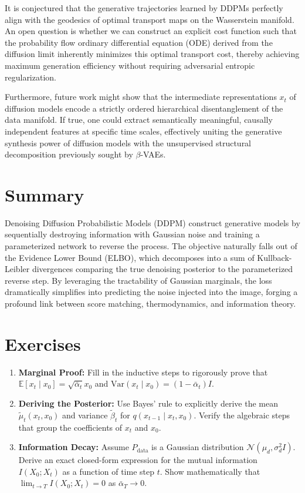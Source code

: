 \begin{horizon}
It is conjectured that the generative trajectories learned by DDPMs perfectly align with the geodesics of optimal transport maps on the Wasserstein manifold. An open question is whether we can construct an explicit cost function such that the probability flow ordinary differential equation (ODE) derived from the diffusion limit inherently minimizes this optimal transport cost, thereby achieving maximum generation efficiency without requiring adversarial entropic regularization.

Furthermore, future work might show that the intermediate representations $x_t$ of diffusion models encode a strictly ordered hierarchical disentanglement of the data manifold. If true, one could extract semantically meaningful, causally independent features at specific time scales, effectively uniting the generative synthesis power of diffusion models with the unsupervised structural decomposition previously sought by $\beta$-VAEs.
\end{horizon}

\section*{Summary}
Denoising Diffusion Probabilistic Models (DDPM) construct generative models by sequentially destroying information with Gaussian noise and training a parameterized network to reverse the process. The objective naturally falls out of the Evidence Lower Bound (ELBO), which decomposes into a sum of Kullback-Leibler divergences comparing the true denoising posterior to the parameterized reverse step. By leveraging the tractability of Gaussian marginals, the loss dramatically simplifies into predicting the noise injected into the image, forging a profound link between score matching, thermodynamics, and information theory.

\section*{Exercises}
\begin{enumerate}
    \item \textbf{Marginal Proof:} Fill in the inductive steps to rigorously prove that $\mathbb{E}[x_t \mid x_0] = \sqrt{\bar{\alpha}_t} x_0$ and $\text{Var}(x_t \mid x_0) = (1 - \bar{\alpha}_t) I$.
    \item \textbf{Deriving the Posterior:} Use Bayes' rule to explicitly derive the mean $\tilde{\mu}_t(x_t, x_0)$ and variance $\tilde{\beta}_t$ for $q(x_{t-1} \mid x_t, x_0)$. Verify the algebraic steps that group the coefficients of $x_t$ and $x_0$.
    \item \textbf{Information Decay:} Assume $P_{\text{data}}$ is a Gaussian distribution $\mathcal{N}(\mu_d, \sigma_d^2 I)$. Derive an exact closed-form expression for the mutual information $I(X_0; X_t)$ as a function of time step $t$. Show mathematically that $\lim_{t \to T} I(X_0; X_t) = 0$ as $\bar{\alpha}_T \to 0$.
\end{enumerate}

